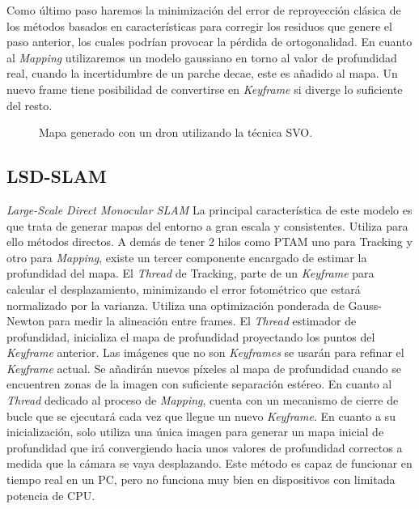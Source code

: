  Como último paso haremos la minimización del error de reproyección clásica de los métodos basados en características para corregir los residuos que genere el paso anterior, los cuales podrían provocar la pérdida de ortogonalidad.
En cuanto al \textit{Mapping} utilizaremos un modelo gaussiano en torno al valor de profundidad real, cuando la incertidumbre de un parche decae, este es añadido al mapa.
Un nuevo frame tiene posibilidad de convertirse en \textit{Keyframe} si diverge lo suficiente del resto.

\begin{figure}[H]
\begin{center}
\end{center}
\caption{Mapa generado con un dron utilizando la técnica SVO.}
\end{figure}


\subsection{LSD-SLAM} 
\textit {Large-Scale Direct Monocular SLAM}
La principal característica de este modelo es que trata de generar mapas del entorno a gran escala y consistentes.
Utiliza para ello métodos directos. A demás de tener 2 hilos como PTAM uno para Tracking y otro para \textit{Mapping}, existe un tercer componente encargado de estimar la profundidad del mapa.\cite{Engel2014lsd}
El \textit{Thread} de Tracking, parte de un \textit{Keyframe}  para calcular el desplazamiento, minimizando el error fotométrico que estará normalizado por la varianza. Utiliza una optimización ponderada de Gauss-Newton para medir la alineación entre frames.
El \textit{Thread} estimador de profundidad, inicializa el mapa de profundidad proyectando los puntos del \textit{Keyframe} anterior. Las imágenes que no son \textit{Keyframes} se usarán para refinar el \textit{Keyframe} actual. Se añadirán nuevos píxeles al mapa de profundidad cuando se encuentren zonas de la imagen con suficiente separación estéreo.
En cuanto al \textit{Thread} dedicado al proceso de \textit{Mapping}, cuenta con un mecanismo de cierre de bucle que se ejecutará cada vez que llegue un nuevo \textit{Keyframe}. En cuanto a su inicialización, solo utiliza una única imagen para generar un mapa inicial de profundidad que irá convergiendo hacia unos valores de profundidad correctos a medida que la cámara se vaya desplazando.
Este método es capaz de funcionar en tiempo real en un PC, pero  no funciona muy bien en dispositivos con limitada potencia de CPU.

